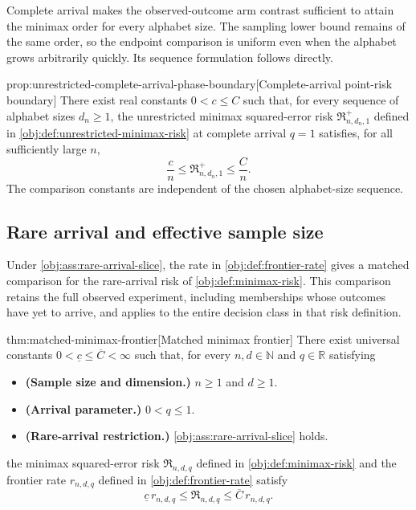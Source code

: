 \documentclass[11pt]{article}
\begin{document}
Complete arrival makes the observed-outcome arm contrast sufficient to attain the minimax order for every alphabet size. The sampling lower bound remains of the same order, so the endpoint comparison is uniform even when the alphabet grows arbitrarily quickly. Its sequence formulation follows directly.

\begin{propositionv}{prop:unrestricted-complete-arrival-phase-boundary}[Complete-arrival point-risk boundary]
There exist real constants \(0<c\le C\) such that, for every sequence of alphabet sizes \(d_n\ge1\), the unrestricted minimax squared-error risk \(\mathfrak R^{+}_{n,d_n,1}\) defined in \cref{obj:def:unrestricted-minimax-risk} at complete arrival \(q=1\) satisfies, for all sufficiently large \(n\),
\[
\frac{c}{n}\le \mathfrak R^{+}_{n,d_n,1}\le \frac{C}{n}.
\]
The comparison constants are independent of the chosen alphabet-size sequence.
\end{propositionv}

\subsection{Rare arrival and effective sample size}

Under \cref{obj:ass:rare-arrival-slice}, the rate in \cref{obj:def:frontier-rate} gives a matched comparison for the rare-arrival risk of \cref{obj:def:minimax-risk}. This comparison retains the full observed experiment, including memberships whose outcomes have yet to arrive, and applies to the entire decision class in that risk definition.

\begin{theoremv}{thm:matched-minimax-frontier}[Matched minimax frontier]
There exist universal constants \(0<\underline c\le\overline C<\infty\) such that, for every \(n,d\in\mathbb N\) and \(q\in\mathbb R\) satisfying
\begin{itemize}
\item \textbf{(Sample size and dimension.)} \(n\ge1\) and \(d\ge1\).
\item \textbf{(Arrival parameter.)} \(0<q\le1\).
\item \textbf{(Rare-arrival restriction.)} \cref{obj:ass:rare-arrival-slice} holds.
\end{itemize}
the minimax squared-error risk \(\mathfrak R_{n,d,q}\) defined in \cref{obj:def:minimax-risk} and the frontier rate \(r_{n,d,q}\) defined in \cref{obj:def:frontier-rate} satisfy
\[
\underline c\,r_{n,d,q}
\le \mathfrak R_{n,d,q}
\le \overline C\,r_{n,d,q}.
\]
\end{theoremv}
\end{document}
